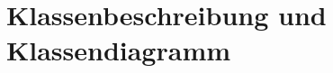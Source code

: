 \chapter{Klassenbeschreibung und Klassendiagramm}
	\newcommand{\class}[1]{\paragraph{Klasse #1:}\ \\ }
	\newcommand{\interface}[1]{\paragraph{Interface #1:}\ \\ }
	\newcommand{\method}[1]{\textcolor{blue}{#1}}
	\newcommand{\kursiv}[1]{{\it #1}}
	\newcommand{\override}{{\it @Override}\ \\}
	
